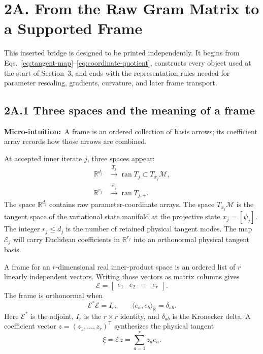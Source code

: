 \documentclass[10pt,twocolumn]{article}
\newcommand{\micro}[1]{\par\noindent\textbf{Micro-intuition:}\ #1\par}
\newcommand{\conceptbreak}{\par\medskip\noindent{\color{black!30}\rule{\columnwidth}{0.35pt}}\par\medskip}
\begin{document}
\conceptbreak

\clearpage
\section*{2A. From the Raw Gram Matrix to a Supported Frame}

This inserted bridge is designed to be printed independently. It begins from
Eqs.~\eqref{eq:tangent-map}--\eqref{eq:coordinate-quotient}, constructs every
object used at the start of Section~3, and ends with the representation rules
needed for parameter rescaling, gradients, curvature, and later frame
transport.

\subsection*{2A.1 Three spaces and the meaning of a frame}

\micro{A frame is an ordered collection of basis arrows; its coefficient array
records how those arrows are combined.}

At accepted inner iterate \(j\), three spaces appear:
\begin{align}
\mathbb R^{d_j}
&\xrightarrow{\ T_j\ }
\operatorname{ran}T_j
\subset T_{x_j}\mathcal M,
\label{eq:bridge-coordinate-to-tangent}\\
\mathbb R^{r_j}
&\xrightarrow{\ \mathcal E_j\ }
\operatorname{ran}T_{j,+}.
\label{eq:bridge-frame-to-tangent}
\end{align}
The space \(\mathbb R^{d_j}\) contains raw parameter-coordinate arrays. The
space \(T_{x_j}\mathcal M\) is the tangent space of the variational state
manifold at the projective state \(x_j=[\psi_j]\). The integer \(r_j\leq d_j\)
is the number of retained physical tangent modes. The map \(\mathcal E_j\)
will carry Euclidean coefficients in \(\mathbb R^{r_j}\) into an orthonormal
physical tangent basis.

A frame for an \(r\)-dimensional real inner-product space is an ordered list
of \(r\) linearly independent vectors. Writing those vectors as matrix columns
gives
\begin{equation}
\mathcal E=
\begin{bmatrix}
e_1&e_2&\cdots&e_r
\end{bmatrix}.
\label{eq:bridge-frame-definition}
\end{equation}
The frame is orthonormal when
\begin{equation}
\mathcal E^*\mathcal E=I_r,
\qquad
\langle e_a,e_b\rangle_{\mathbb R}=\delta_{ab}.
\label{eq:bridge-orthonormal-frame-definition}
\end{equation}
Here \(\mathcal E^*\) is the adjoint, \(I_r\) is the \(r\times r\) identity,
and \(\delta_{ab}\) is the Kronecker delta. A coefficient vector
\(z=(z_1,\ldots,z_r)^{\mathsf T}\) synthesizes the physical tangent
\begin{equation}
\xi=\mathcal Ez=\sum_{a=1}^{r}z_ae_a.
\label{eq:bridge-frame-synthesis}
\end{equation}
\end{document}
